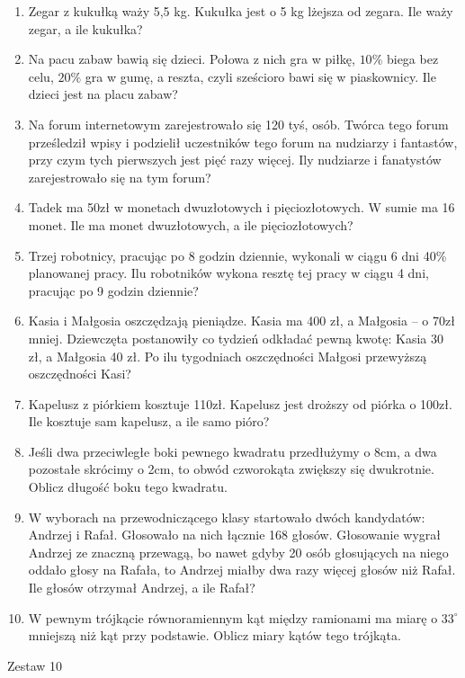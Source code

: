 \documentclass[12pt,a4paper]{article}
\begin{document}
\normalsize 
\begin{enumerate}[1.]
	\item Zegar z kukułką waży 5,5 kg. Kukułka jest o 5 kg lżejsza od zegara. Ile waży zegar, a ile kukułka?
	\item Na pacu zabaw bawią się dzieci. Połowa z nich gra w piłkę, $10\%$ biega bez celu, $20\%$ gra w gumę, a reszta, czyli sześcioro bawi się w piaskownicy. Ile dzieci jest na placu zabaw?
	\item Na forum internetowym zarejestrowało się 120 tyś, osób. Twórca tego forum prześledził wpisy i podzielił uczestników tego forum na nudziarzy i fantastów, przy czym tych pierwszych jest pięć razy więcej. Ily nudziarze i fanatystów zarejestrowało się na tym forum?
	\item Tadek ma 50zł w monetach dwuzłotowych i pięciozłotowych. W sumie ma 16 monet. Ile ma monet dwuzłotowych, a ile pięciozłotowych?
	\item Trzej robotnicy, pracując po 8 godzin dziennie, wykonali w ciągu 6 dni 40\% planowanej pracy. Ilu robotników wykona resztę tej pracy w ciągu 4 dni, pracując po 9 godzin dziennie?
	\item Kasia i Małgosia oszczędzają pieniądze. Kasia ma 400 zł, a Małgosia – o 70zł mniej. Dziewczęta postanowiły co tydzień odkładać pewną kwotę: Kasia 30 zł, a Małgosia 40 zł. Po ilu tygodniach oszczędności Małgosi przewyższą oszczędności Kasi?
	\item Kapelusz z piórkiem kosztuje 110zł. Kapelusz jest droższy od piórka o 100zł. Ile kosztuje sam kapelusz, a ile samo pióro?
	\item Jeśli dwa przeciwległe boki pewnego kwadratu przedłużymy o 8cm, a dwa pozostałe skrócimy o 2cm, to obwód czworokąta zwiększy się dwukrotnie. Oblicz długość boku tego kwadratu.
	\item W wyborach na przewodniczącego klasy startowało dwóch kandydatów: Andrzej i Rafał. Głosowało na nich łącznie 168 głosów. Głosowanie wygrał Andrzej ze znaczną przewagą, bo nawet gdyby 20 osób głosujących na niego oddało głosy na Rafała, to Andrzej miałby dwa razy więcej głosów niż Rafał. Ile głosów otrzymał Andrzej, a ile Rafał?
	\item W pewnym trójkącie równoramiennym kąt między ramionami ma miarę o $33^\circ$ mniejszą niż kąt przy podstawie. Oblicz miary kątów tego trójkąta.
\end{enumerate}
\newpage
\LARGE \begin{center}
	Zestaw 10
\end{center}
\normalsize 
\end{document}
